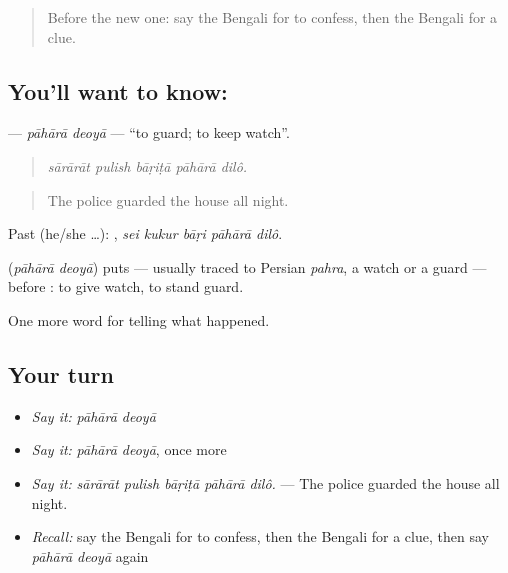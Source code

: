\label{lesson:BN-C284-pahara-deoya}



\begin{quote}
Before the new one: say the Bengali for to confess, then the Bengali for a clue.
\end{quote}

\subsection*{You'll want to know:  }
\textbf{ } — \emph{pāhārā deoyā} — \textquotedblleft{}to guard; to keep watch\textquotedblright{}.

\begin{quote}
    
\end{quote}

\begin{quote}
\emph{sārārāt pulish bāṛiṭā pāhārā dilô.}
\end{quote}

\begin{quote}
The police guarded the house all night.
\end{quote}

Past (he/she …):     , \emph{sei kukur bāṛi pāhārā dilô}.

\begin{cousinweb}
\textbf{ } (\emph{pāhārā deoyā}) puts  — usually traced to Persian \emph{pahra}, a watch or a guard — before : to give watch, to stand guard.
\end{cousinweb}

\begin{grammarlens}[title={What you've built}]
One more word for telling what happened.
\end{grammarlens}

\subsection*{Your turn}
\begin{itemize}
\raggedright
  \item \emph{Say it:} \emph{pāhārā deoyā}
  \item \emph{Say it:} \emph{pāhārā deoyā}, once more
  \item \emph{Say it:} \emph{sārārāt pulish bāṛiṭā pāhārā dilô.} — The police guarded the house all night.
  \item \emph{Recall:} say the Bengali for to confess, then the Bengali for a clue, then say \emph{pāhārā deoyā} again
\end{itemize}

